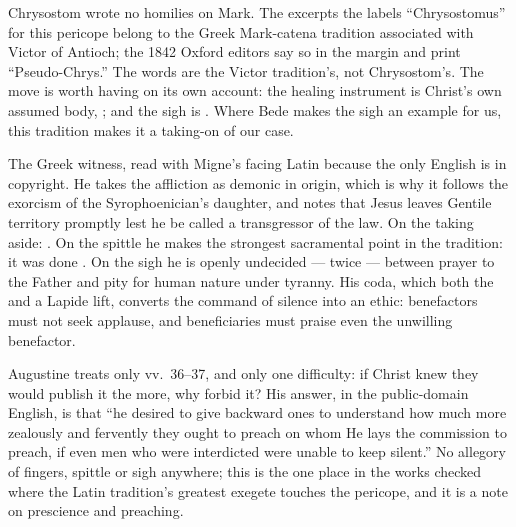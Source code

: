 \begin{witnessnote}
Chrysostom wrote no homilies on Mark. The excerpts the  labels
``Chrysostomus'' for this pericope belong to the Greek Mark-catena tradition
associated with Victor of Antioch; the 1842 Oxford editors say so in the
margin and print ``Pseudo-Chrys.'' The words are the Victor tradition's, not
Chrysostom's. The move is worth having on its own account: the healing
instrument is Christ's own assumed body, ; and the sigh is . Where Bede makes the sigh an example
for us, this tradition makes it a taking-on of our case.
\end{witnessnote}

\begin{witnessnote}
The Greek witness, read with Migne's facing Latin because the only English is
in copyright. He takes the affliction as demonic in origin, which is why it
follows the exorcism of the Syrophoenician's daughter, and notes that Jesus
leaves Gentile territory promptly lest he be called a transgressor of the law.
On the taking aside: . On the spittle he makes the strongest sacramental
point in the tradition: it was done . On the sigh he is
openly undecided --- twice  --- between prayer to the Father
and pity for human nature under tyranny. His coda, which both the 
and a Lapide lift, converts the command of silence into an ethic: benefactors
must not seek applause, and beneficiaries must praise even the unwilling
benefactor.
\end{witnessnote}

\begin{witnessnote}
Augustine treats only vv.~36--37, and only one difficulty: if Christ knew they
would publish it the more, why forbid it? His answer, in the public-domain
English, is that ``he desired to give backward ones to understand how much more
zealously and fervently they ought to preach on whom He lays the commission to
preach, if even men who were interdicted were unable to keep silent.'' No
allegory of fingers, spittle or sigh anywhere; this is the one place in the
works checked where the Latin tradition's greatest exegete touches the
pericope, and it is a note on prescience and preaching.
\end{witnessnote}

